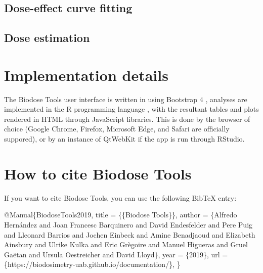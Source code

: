 \documentclass[]{scrartcl}
\newenvironment{Shaded}{\begin{snugshade}}{\end{snugshade}}
\newcommand{\NormalTok}[1]{#1}
\begin{document}
\hypertarget{dose-effect-curve-fitting-1}{%
\subsection{Dose-effect curve fitting}\label{dose-effect-curve-fitting-1}}

\hypertarget{dose-estimation-1}{%
\subsection{Dose estimation}\label{dose-estimation-1}}

\hypertarget{refs}{}

\hypertarget{appendix-appendices}{%
\appendix}


\hypertarget{app:implementation}{%
\section{Implementation details}\label{app:implementation}}

The Biodose Tools user interface is written in \citep{R-shiny} using Bootstrap 4 \citep{R-bs4Dash}, analyses are implemented in the R programming language \citep{R-base}, with the resultant tables and plots rendered in HTML through JavaScript libraries. This is done by the browser of choice (Google Chrome, Firefox, Microsoft Edge, and Safari are officially suppored), or by an instance of QtWebKit if the app is run through RStudio.

\hypertarget{how-to-cite-biodose-tools}{%
\section{How to cite Biodose Tools}\label{how-to-cite-biodose-tools}}

If you want to cite Biodose Tools, you can use the following BibTeX entry:

\begin{Shaded}
\begin{Highlighting}[]
\NormalTok{@Manual\{BiodoseTools2019,}
\NormalTok{  title = \{\{Biodose Tools\}\},}
\NormalTok{  author = \{Alfredo Hernández and Joan Francesc Barquinero and David Endesfelder and Pere Puig and Lleonard Barrios and Jochen Einbeck and Amine Benadjaoud and Elizabeth Ainsbury and Ulrike Kulka and Eric Grègoire and Manuel Higueras and Gruel Gaëtan and Ursula Oestreicher and David Lloyd\},}
\NormalTok{  year = \{2019\},}
\NormalTok{  url = \{https://biodosimetry-uab.github.io/documentation/\},}
\NormalTok{\}}
\end{Highlighting}
\end{Shaded}


\end{document}
